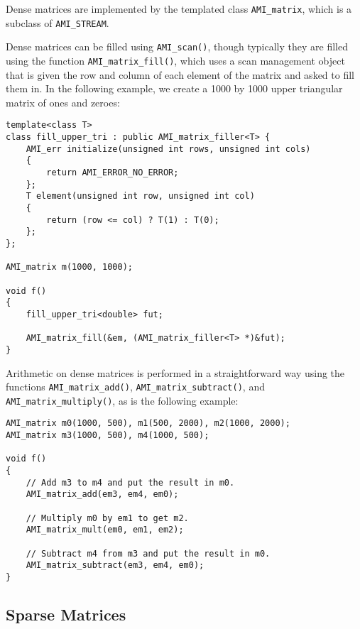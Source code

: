 
Dense matrices are implemented by the templated class
\verb|AMI_matrix|,
 which is a subclass of
\verb|AMI_STREAM|.

Dense matrices can be filled using \verb|AMI_scan()|, though typically
they are filled using the function \verb|AMI_matrix_fill()|, which
uses a scan management object that is given the row and column of each
element of the matrix and asked to fill them in.  In the following
example, we create a 1000 by 1000 upper triangular matrix of ones and
zeroes:

\begin{verbatim}
template<class T>
class fill_upper_tri : public AMI_matrix_filler<T> {
    AMI_err initialize(unsigned int rows, unsigned int cols)
    {
        return AMI_ERROR_NO_ERROR;
    };
    T element(unsigned int row, unsigned int col)
    {
        return (row <= col) ? T(1) : T(0);
    };
};

AMI_matrix m(1000, 1000);

void f()
{
    fill_upper_tri<double> fut;

    AMI_matrix_fill(&em, (AMI_matrix_filler<T> *)&fut);
}
\end{verbatim}

Arithmetic on dense matrices is performed in a straightforward way
using the functions \verb|AMI_matrix_add()|,
\verb|AMI_matrix_subtract()|, and \verb|AMI_matrix_multiply()|, as is
the following example:

\begin{verbatim}
AMI_matrix m0(1000, 500), m1(500, 2000), m2(1000, 2000);
AMI_matrix m3(1000, 500), m4(1000, 500);

void f()
{
    // Add m3 to m4 and put the result in m0.
    AMI_matrix_add(em3, em4, em0);
   
    // Multiply m0 by em1 to get m2.
    AMI_matrix_mult(em0, em1, em2);

    // Subtract m4 from m3 and put the result in m0.
    AMI_matrix_subtract(em3, em4, em0);        
}
\end{verbatim}


\subsection{Sparse Matrices}
\label{sec:sparse-mat}


